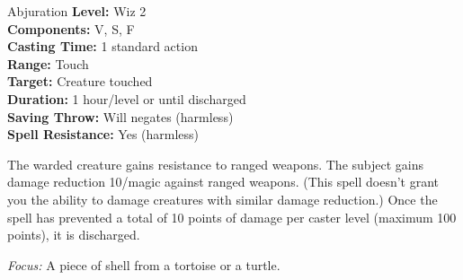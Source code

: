 {Abjuration}
{
	\textbf{Level:}
	Wiz 2\\
	\textbf{Components:}
	V, S, F\\
	\textbf{Casting Time:}
	1 standard action\\
	\textbf{Range:}
	Touch\\
	\textbf{Target:}
	Creature touched\\
	\textbf{Duration:}
	1 hour/level or until discharged\\
	\textbf{Saving Throw:}
	Will negates (harmless)\\
	\textbf{Spell Resistance:}
	Yes (harmless)\\
}
{
	The warded creature gains resistance to ranged weapons. The subject gains damage reduction 10/magic against ranged weapons. (This spell doesn't grant you the ability to damage creatures with similar damage reduction.) Once the spell has prevented a total of 10 points of damage per caster level (maximum 100 points), it is discharged.

	\textit{Focus:}
	A piece of shell from a tortoise or a turtle.

}
